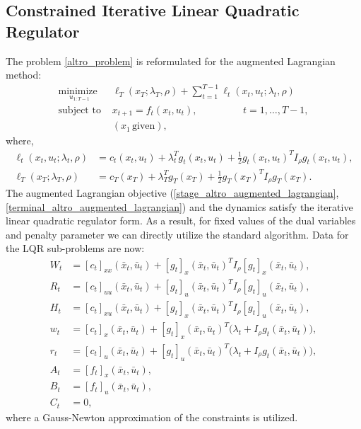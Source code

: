 \subsection{Constrained Iterative Linear Quadratic Regulator}
The problem \eqref{altro_problem} is reformulated for the augmented Lagrangian method:
\begin{equation}
	\begin{array}{ll}
		\underset{u_{1:T-1}}{\mbox{minimize }} & \ell_T(x_T; \lambda_T, \rho) + \sum \limits_{t = 1}^{T-1} \ell_t(x_t, u_t; \lambda_t, \rho)\\
		\mbox{subject to } & x_{t+1} = f_t(x_t, u_t),\phantom{\mathcal{K},} \quad \quad \quad \, t = 1,\dots,T-1,\\
		& (x_1 \, \text{given}), \label{altro_augmented_lagrangian_problem}
	\end{array}
\end{equation}
where,
\begin{align}
	\ell_t(x_t, u_t; \lambda_t, \rho) &= c_t(x_t, u_t) + \lambda_t^T g_t(x_t, u_t) + \frac{1}{2} g_t(x_t, u_t)^T I_{\rho} g_t(x_t, u_t), \label{stage_altro_augmented_lagrangian}\\
	\ell_T(x_T; \lambda_T, \rho) &= c_T(x_T) + \lambda_T^T g_T(x_T) + \frac{1}{2} g_T(x_T)^T I_{\rho} g_T(x_T). \label{terminal_altro_augmented_lagrangian}
\end{align}
The augmented Lagrangian objective (\ref{stage_altro_augmented_lagrangian}, \ref{terminal_altro_augmented_lagrangian}) and the dynamics satisfy the iterative linear quadratic regulator form. As a result, for fixed values of the dual variables and penalty parameter we can directly utilize the standard algorithm. Data for the LQR sub-problems are now:
\begin{align}
	W_t &= [c_t]_{xx}(\bar{x}_t, \bar{u}_t) + [g_t]_{x}(\bar{x}_t, \bar{u}_t)^T I_{\rho} [g_t]_{x}(\bar{x}_t, \bar{u}_t), \\
	R_t &= [c_t]_{uu}(\bar{x}_t, \bar{u}_t) + [g_t]_{u}(\bar{x}_t, \bar{u}_t)^T I_{\rho} [g_t]_{u}(\bar{x}_t, \bar{u}_t), \\
	H_t &= [c_t]_{xu}(\bar{x}_t, \bar{u}_t) + [g_t]_{x}(\bar{x}_t, \bar{u}_t)^T I_{\rho} [g_t]_{u}(\bar{x}_t, \bar{u}_t), \\
	w_t &= [c_t]_{x}(\bar{x}_t, \bar{u}_t) + [g_t]_{x}(\bar{x}_t, \bar{u}_t)^T \Big(\lambda_t + I_{\rho} g_t(\bar{x}_t, \bar{u}_t) \Big), \\
	r_t &= [c_t]_{u}(\bar{x}_t, \bar{u}_t) + [g_t]_{u}(\bar{x}_t, \bar{u}_t)^T \Big(\lambda_t + I_{\rho} g_t(\bar{x}_t, \bar{u}_t) \Big), \\
	A_t &= [f_t]_{x}(\bar{x}_t, \bar{u}_t), \\
	B_t &= [f_t]_{u}(\bar{x}_t, \bar{u}_t), \\
	C_t &= 0,
\end{align}
where a Gauss-Newton approximation of the constraints is utilized.

